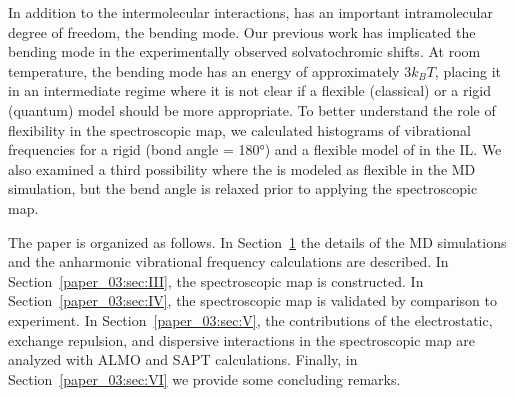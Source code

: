 \documentclass[%
  class = book,%
  crop = false,%
  float = true,%
  multi = true,%
  preview = false,%
]{standalone}
\begin{document}
In addition to the intermolecular interactions,  has an important intramolecular degree of freedom, the bending mode. Our previous work\cite{Brinzer2015} has implicated the bending mode in the experimentally observed solvatochromic shifts. At room temperature, the bending mode has an energy of approximately \(3k_{B}T\), placing it in an intermediate regime where it is not clear if a flexible (classical) or a rigid (quantum) model should be more appropriate. To better understand the role of  flexibility in the spectroscopic map, we calculated histograms of vibrational frequencies for a rigid (bond angle = \ang{180}) and a flexible model of  in the \ce{[C4C1im][PF6]} IL. We also examined a third possibility where the  is modeled as flexible in the MD simulation, but the bend angle is relaxed prior to applying the spectroscopic map.

The paper is organized as follows. In Section~\ref{paper_03:sec:II} the details of the MD simulations and the anharmonic vibrational frequency calculations are described. In Section~\ref{paper_03:sec:III}, the spectroscopic map is constructed. In Section~\ref{paper_03:sec:IV}, the spectroscopic map is validated by comparison to experiment. In Section~\ref{paper_03:sec:V}, the contributions of the electrostatic, exchange repulsion, and dispersive interactions in the spectroscopic map are analyzed with ALMO and SAPT calculations. Finally, in Section~\ref{paper_03:sec:VI} we provide some concluding remarks.

\section{\texorpdfstring{}{Computational Methods}}
\label{paper_03:sec:II}
\end{document}

